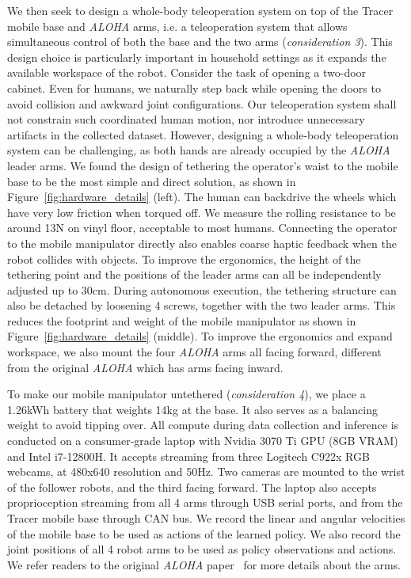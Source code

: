 \documentclass[11pt, a4paper, logo, twocolumn]{stanford}
\newcommand{\aloha}{\textit{ALOHA} }
\begin{document}
We then seek to design a whole-body teleoperation system on top of the Tracer mobile base and \aloha arms,  i.e. a teleoperation system that allows simultaneous control of both the base and the two arms (\textit{consideration 3}).
This design choice is particularly important in household settings as it expands the available workspace of the robot. Consider the task of opening a two-door cabinet. Even for humans, we naturally step back while opening the doors to avoid collision and awkward joint configurations. Our teleoperation system shall not constrain such coordinated human motion, nor introduce unnecessary artifacts in the collected dataset.
However, designing a whole-body teleoperation system can be challenging, as both hands are already occupied by the \aloha leader arms.
We found the design of tethering the operator's waist to the mobile base to be the most simple and direct solution, as shown in Figure~\ref{fig:hardware_details} (left). The human can backdrive the wheels which have very low friction when torqued off. We measure the rolling resistance to be around 13N on vinyl floor, acceptable to most humans. Connecting the operator to the mobile manipulator directly also enables coarse haptic feedback when the robot collides with objects.
To improve the ergonomics, the height of the tethering point and the positions of the leader arms can all be independently adjusted up to 30cm. 
During autonomous execution, the tethering structure can also be detached by loosening 4 screws, together with the two leader arms. This reduces the footprint and weight of the mobile manipulator as shown in Figure~\ref{fig:hardware_details} (middle).
To improve the ergonomics and expand workspace, we also mount the four \aloha arms all facing forward, different from the original \aloha which has arms facing inward.

To make our mobile manipulator untethered (\textit{consideration 4}), 
we place a 1.26kWh battery that weights 14kg at the base. It also serves as a balancing weight to avoid tipping over.
All compute during data collection and inference is conducted on a consumer-grade laptop with Nvidia 3070 Ti GPU (8GB VRAM) and Intel i7-12800H.
It accepts streaming from three Logitech C922x RGB webcams, at 480x640 resolution and 50Hz. Two cameras are mounted to the wrist of the follower robots, and the third facing forward.
The laptop also accepts proprioception streaming from all 4 arms through USB serial ports, and from the Tracer mobile base through CAN bus.
We record the linear and angular velocities of the mobile base to be used as actions of the learned policy.
We also record the joint positions of all 4 robot arms to be used as policy observations and actions. We refer readers to the original \aloha paper~\cite{zhao2023learning} for more details about the arms.
\end{document}
